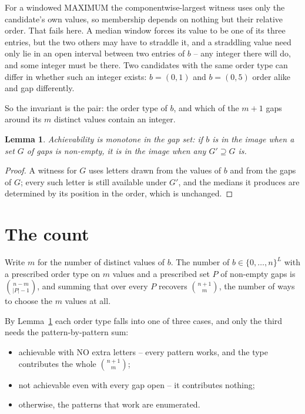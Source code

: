\documentclass[11pt,a4paper]{article}
\theoremstyle{plain}
\newtheorem{lemma}[theorem]{Lemma}
\theoremstyle{definition}
\begin{document}
For a windowed MAXIMUM the componentwise-largest witness uses only the candidate's own values,
so membership depends on nothing but their relative order. That fails here. A median window
forces its value to be one of its three entries, but the two others may have to straddle it, and
a straddling value need only lie in an open interval between two entries of $b$ -- any integer
there will do, and some integer must be there. Two candidates with the same order type can differ
in whether such an integer exists: $b=(0,1)$ and $b=(0,5)$ order alike and gap differently.

So the invariant is the pair: the order type of $b$, and which of the $m+1$ gaps around its $m$
distinct values contain an integer.

\begin{lemma}\label{lem:mono}
Achievability is monotone in the gap set: if $b$ is in the image when a set $G$ of gaps is
non-empty, it is in the image when any $G'\supseteq G$ is.
\end{lemma}

\begin{proof}
A witness for $G$ uses letters drawn from the values of $b$ and from the gaps of $G$; every such
letter is still available under $G'$, and the medians it produces are determined by its position
in the order, which is unchanged.
\end{proof}

\section{The count}

Write $m$ for the number of distinct values of $b$. The number of $b\in\{0,\dots,n\}^{L}$ with
a prescribed order type on $m$ values and a prescribed set $P$ of non-empty gaps is
$\binom{n-m}{\lvert P\rvert-1}$, and summing that over every $P$ recovers
$\binom{n+1}{m}$, the number of ways to choose the $m$ values at all.

By Lemma~\ref{lem:mono} each order type falls into one of three cases, and only the third needs
the pattern-by-pattern sum:

\begin{itemize}
\item achievable with NO extra letters -- every pattern works, and the type contributes the whole
      $\binom{n+1}{m}$;
\item not achievable even with every gap open -- it contributes nothing;
\item otherwise, the patterns that work are enumerated.
\end{itemize}
\end{document}
